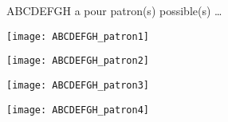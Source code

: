 \begin{QCM}
\begin{GroupeQCM}
    
    \begin{exercice}
      ABCDEFGH a pour patron(s) possible(s) \ldots
      \begin{ChoixQCM}{4}
      \item \texttt{[image: ABCDEFGH\_patron1]}
      \item \texttt{[image: ABCDEFGH\_patron2]}
      \item \texttt{[image: ABCDEFGH\_patron3]}
      \item \texttt{[image: ABCDEFGH\_patron4]}
      \end{ChoixQCM}
\begin{corrige}
   \end{corrige}
    \end{exercice}
 \end{GroupeQCM}
\end{QCM}   
    

